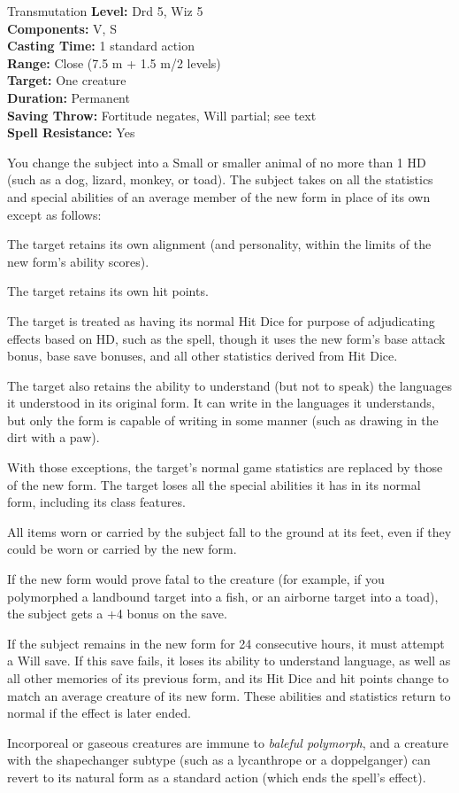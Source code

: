 {Transmutation}
{
	\textbf{Level:}
	Drd 5, Wiz 5\\
	\textbf{Components:}
	V, S\\
	\textbf{Casting Time:}
	1 standard action\\
	\textbf{Range:}
	Close (7.5 m + 1.5 m/2 levels)\\
	\textbf{Target:}
	One creature\\
	\textbf{Duration:}
	Permanent\\
	\textbf{Saving Throw:}
	Fortitude negates, Will partial; see text\\
	\textbf{Spell Resistance:}
	Yes\\
}
{
	You change the subject into a Small or smaller animal of no more than 1 HD (such as a dog, lizard, monkey, or toad). The subject takes on all the statistics and special abilities of an average member of the new form in place of its own except as follows:

\begin{itemize*}
\item The target retains its own alignment (and personality, within the limits of the new form's ability scores).
\item The target retains its own hit points.
\item The target is treated as having its normal Hit Dice for purpose of adjudicating effects based on HD, such as the  spell, though it uses the new form's base attack bonus, base save bonuses, and all other statistics derived from Hit Dice.
\item The target also retains the ability to understand (but not to speak) the languages it understood in its original form. It can write in the languages it understands, but only the form is capable of writing in some manner (such as drawing in the dirt with a paw).
\end{itemize*}

	With those exceptions, the target's normal game statistics are replaced by those of the new form. The target loses all the special abilities it has in its normal form, including its class features.

	All items worn or carried by the subject fall to the ground at its feet, even if they could be worn or carried by the new form.

	If the new form would prove fatal to the creature (for example, if you polymorphed a landbound target into a fish, or an airborne target into a toad), the subject gets a +4 bonus on the save.

	If the subject remains in the new form for 24 consecutive hours, it must attempt a Will save. If this save fails, it loses its ability to understand language, as well as all other memories of its previous form, and its Hit Dice and hit points change to match an average creature of its new form. These abilities and statistics return to normal if the effect is later ended.

	Incorporeal or gaseous creatures are immune to \emph{baleful polymorph}, and a creature with the shapechanger subtype (such as a lycanthrope or a doppelganger) can revert to its natural form as a standard action (which ends the spell's effect).

}
